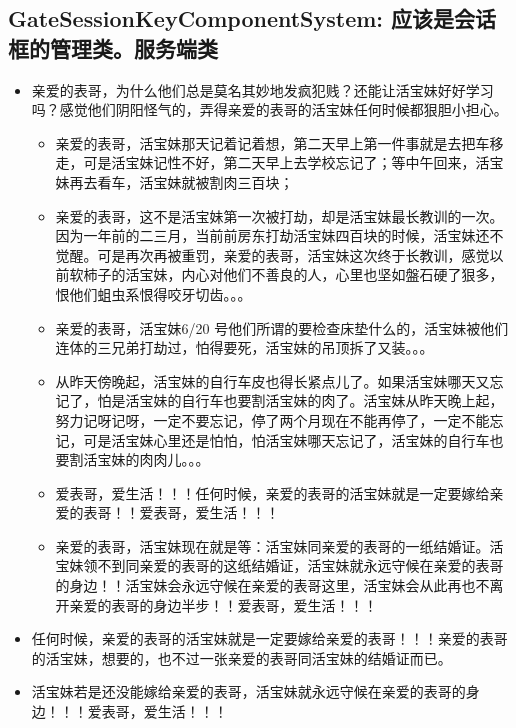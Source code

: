 \documentclass[9pt, b5paper]{article}
\begin{document}
\subsection{GateSessionKeyComponentSystem: 应该是会话框的管理类。服务端类}
\label{sec:org2dac8de}
\begin{itemize}
\item 亲爱的表哥，为什么他们总是莫名其妙地发疯犯贱？还能让活宝妹好好学习吗？感觉他们阴阳怪气的，弄得亲爱的表哥的活宝妹任何时候都狠胆小担心。
\begin{itemize}
\item 亲爱的表哥，活宝妹那天记着记着想，第二天早上第一件事就是去把车移走，可是活宝妹记性不好，第二天早上去学校忘记了；等中午回来，活宝妹再去看车，活宝妹就被割肉三百块；
\item 亲爱的表哥，这不是活宝妹第一次被打劫，却是活宝妹最长教训的一次。因为一年前的二三月，当前前房东打劫活宝妹四百块的时候，活宝妹还不觉醒。可是再次再被重罚，亲爱的表哥，活宝妹这次终于长教训，感觉以前软柿子的活宝妹，内心对他们不善良的人，心里也坚如盤石硬了狠多，恨他们蛆虫系恨得咬牙切齿。。。
\item 亲爱的表哥，活宝妹6/20 号他们所谓的要检查床垫什么的，活宝妹被他们连体的三兄弟打劫过，怕得要死，活宝妹的吊顶拆了又装。。。
\item 从昨天傍晚起，活宝妹的自行车皮也得长紧点儿了。如果活宝妹哪天又忘记了，怕是活宝妹的自行车也要割活宝妹的肉了。活宝妹从昨天晚上起，努力记呀记呀，一定不要忘记，停了两个月现在不能再停了，一定不能忘记，可是活宝妹心里还是怕怕，怕活宝妹哪天忘记了，活宝妹的自行车也要割活宝妹的肉肉儿。。。
\item 爱表哥，爱生活！！！任何时候，亲爱的表哥的活宝妹就是一定要嫁给亲爱的表哥！！爱表哥，爱生活！！！
\item 亲爱的表哥，活宝妹现在就是等：活宝妹同亲爱的表哥的一纸结婚证。活宝妹领不到同亲爱的表哥的这纸结婚证，活宝妹就永远守候在亲爱的表哥的身边！！活宝妹会永远守候在亲爱的表哥这里，活宝妹会从此再也不离开亲爱的表哥的身边半步！！爱表哥，爱生活！！！
\end{itemize}
\item 任何时候，亲爱的表哥的活宝妹就是一定要嫁给亲爱的表哥！！！亲爱的表哥的活宝妹，想要的，也不过一张亲爱的表哥同活宝妹的结婚证而已。
\item 活宝妹若是还没能嫁给亲爱的表哥，活宝妹就永远守候在亲爱的表哥的身边！！！爱表哥，爱生活！！！
\end{itemize}
\end{document}
